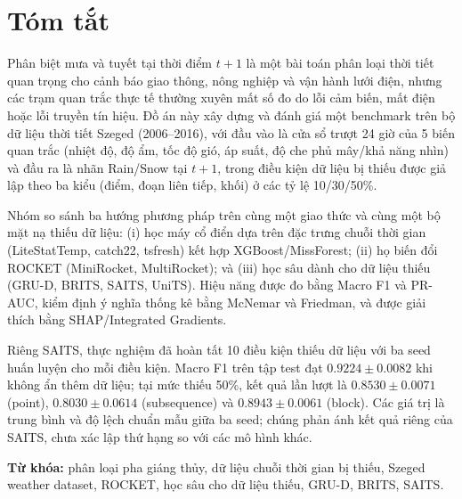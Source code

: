 \section*{Tóm tắt}

Phân biệt mưa và tuyết tại thời điểm $t+1$ là một bài toán phân loại thời tiết quan
trọng cho cảnh báo giao thông, nông nghiệp và vận hành lưới điện, nhưng các trạm quan
trắc thực tế thường xuyên mất số đo do lỗi cảm biến, mất điện hoặc lỗi truyền tín hiệu.
Đồ án này xây dựng và đánh giá một benchmark trên bộ dữ liệu thời tiết Szeged
(2006--2016), với đầu vào là cửa sổ trượt 24 giờ của 5 biến quan trắc (nhiệt độ, độ ẩm,
tốc độ gió, áp suất, độ che phủ mây/khả năng nhìn) và đầu ra là nhãn Rain/Snow tại
$t+1$, trong điều kiện dữ liệu bị thiếu được giả lập theo ba kiểu (điểm, đoạn liên tiếp,
khối) ở các tỷ lệ 10/30/50\%.

Nhóm so sánh ba hướng phương pháp trên cùng một giao thức và cùng một bộ mặt nạ thiếu
dữ liệu: (i) học máy cổ điển dựa trên đặc trưng chuỗi thời gian (LiteStatTemp, catch22,
tsfresh) kết hợp XGBoost/MissForest; (ii) họ biến đổi ROCKET (MiniRocket, MultiRocket);
và (iii) học sâu dành cho dữ liệu thiếu (GRU-D, BRITS, SAITS, UniTS). Hiệu năng được đo
bằng Macro F1 và PR-AUC, kiểm định ý nghĩa thống kê bằng McNemar và Friedman, và được
giải thích bằng SHAP/Integrated Gradients.


Riêng SAITS, thực nghiệm đã hoàn tất 10 điều kiện thiếu dữ liệu với ba seed huấn
luyện cho mỗi điều kiện. Macro F1 trên tập test đạt $0.9224 \pm 0.0082$ khi không
ẩn thêm dữ liệu; tại mức thiếu 50\%, kết quả lần lượt là $0.8530 \pm 0.0071$
(point), $0.8030 \pm 0.0614$ (subsequence) và $0.8943 \pm 0.0061$ (block).
Các giá trị là trung bình và độ lệch chuẩn mẫu giữa ba seed; chúng phản ánh kết
quả riêng của SAITS, chưa xác lập thứ hạng so với các mô hình khác.

\textbf{Từ khóa:} phân loại pha giáng thủy, dữ liệu chuỗi thời gian bị thiếu, Szeged
weather dataset, ROCKET, học sâu cho dữ liệu thiếu, GRU-D, BRITS, SAITS.
